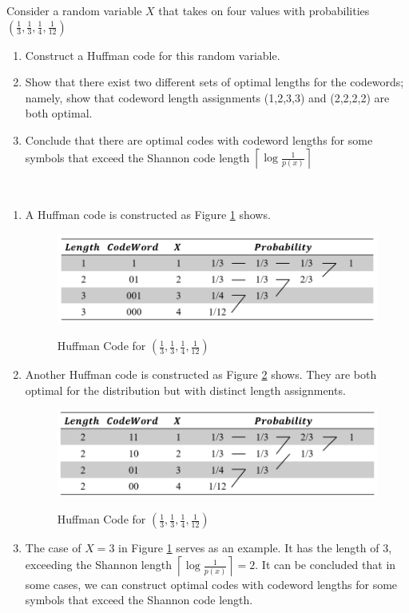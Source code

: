 \begin{exercise}{ Consider a random variable $X$ that takes on four values with probabilities $\left(\frac{1}{3}, \frac{1}{3}, \frac{1}{4}, \frac{1}{12}\right)$
  \begin{enumerate}
    \item Construct a Huffman code for this random variable.
    \item Show that there exist two different sets of optimal lengths for the codewords; namely, show that codeword length assignments (1,2,3,3) and (2,2,2,2) are both optimal.
    \item Conclude that there are optimal codes with codeword lengths for some symbols that exceed the Shannon code length $\left\lceil\log \frac{1}{p(x)}\right\rceil$
  \end{enumerate}
}
  \begin{solution}
  \par{~}
  \begin{enumerate}
    \item { A Huffman code is constructed as Figure \ref{fig:ex8-1} shows.
      \begin{figure}[H]
        \caption{Huffman Code for $\left(\frac{1}{3}, \frac{1}{3}, \frac{1}{4}, \frac{1}{12}\right)$}
        \centering
        \includegraphics[width=11cm]{img/5-3.png}
        \label{fig:ex8-1}
      \end{figure}
    }
    \item { Another Huffman code is constructed as Figure \ref{fig:ex8-2} shows. They are both optimal for the distribution but with distinct length assignments.
      \begin{figure}[H]
        \caption{Huffman Code for $\left(\frac{1}{3}, \frac{1}{3}, \frac{1}{4}, \frac{1}{12}\right)$}
        \centering
        \includegraphics[width=11cm]{img/5-4.png}
        \label{fig:ex8-2}
      \end{figure}
    }
    \item { The case of $X=3$ in Figure \ref{fig:ex8-1} serves as an example. It has the length of 3, exceeding the Shannon length  $\left\lceil\log \frac{1}{p(x)}\right\rceil = 2$. It can be concluded that in some cases, we can construct optimal codes with codeword lengths for some symbols that exceed the Shannon code length.
    }
  \end{enumerate}
  \end{solution}
  \label{ex8}
\end{exercise}

